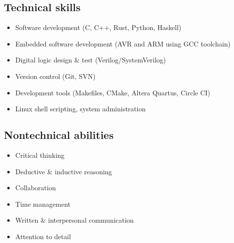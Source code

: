 
\vspace{-1.2em}

\begin{multicols}{2}
  \subsection*{Technical skills}

  \begin{itemize}
    \item Software development (C, C++, Rust, Python, Haskell)
    \item Embedded software development (AVR and ARM using GCC toolchain)
    \item Digital logic design \& test (Verilog/SystemVerilog)
    \item Version control (Git, SVN)
    \item Development tools (Makefiles, CMake, Altera Quartus, Circle CI)
    \item Linux shell scripting, system administration
  \end{itemize}

  \vfill\null
  \columnbreak

  \subsection*{Nontechnical abilities}

  \begin{itemize}
    \item Critical thinking
    \item Deductive \& inductive reasoning
    \item Collaboration
    \item Time management
    \item Written \& interpersonal communication
    \item Attention to detail
  \end{itemize}

  \vfill\null
\end{multicols}
